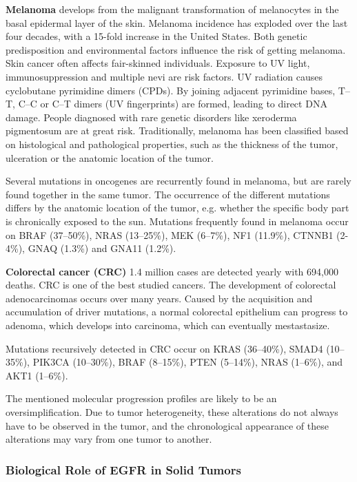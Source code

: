 {{{    \textbf{Melanoma} develops from the malignant transformation of melanocytes
    in the basal epidermal layer of the skin. Melanoma incidence has exploded
    over the last four decades, with a 15-fold increase in the United States.
    Both genetic predisposition and environmental factors influence the risk of
    getting melanoma. Skin cancer often affects fair-skinned individuals.
    Exposure to UV light, immunosuppression and multiple nevi are risk factors.
    UV radiation causes cyclobutane pyrimidine dimers (CPDs). By joining
    adjacent pyrimidine bases, T--T, C--C or C--T dimers (UV fingerprints) are
    formed, leading to direct DNA damage. People diagnosed with rare genetic
    disorders like xeroderma pigmentosum are at great risk. Traditionally,
    melanoma has been classified based on histological and pathological
    properties, such as the thickness of the tumor, ulceration or the anatomic
    location of the tumor.



    Several mutations in oncogenes are recurrently found in melanoma, but are
    rarely found together in the same tumor. The occurrence of the different
    mutations differs by the anatomic location of the tumor, e.g. whether the
    specific body part is chronically exposed to the sun. Mutations frequently
    found in melanoma occur on BRAF (37--50\%), NRAS (13--25\%), MEK (6--7\%),
    NF1 (11.9\%), CTNNB1 (2-4\%), GNAQ (1.3\%) and GNA11 (1.2\%).

    \textbf{Colorectal cancer (CRC)} 1.4 million cases are detected yearly with
    694,000 deaths. CRC is one of the best studied cancers. The development of
    colorectal adenocarcinomas occurs over many years. Caused by the acquisition
    and accumulation of driver mutations, a normal colorectal epithelium can
    progress to adenoma, which develops into carcinoma, which can eventually
    mestastasize.



    Mutations recursively detected in CRC occur on KRAS (36--40\%), SMAD4
    (10--35\%), PIK3CA (10--30\%), BRAF (8--15\%), PTEN (5--14\%), NRAS
    (1--6\%), and  AKT1 (1--6\%).

    The mentioned molecular progression profiles are likely to be an
    oversimplification. Due to tumor heterogeneity, these alterations do not
    always have to be observed in the tumor, and the chronological appearance
    of these alterations may vary from one tumor to another.

    \subsubsection{Biological Role of EGFR in Solid Tumors}

}}}
